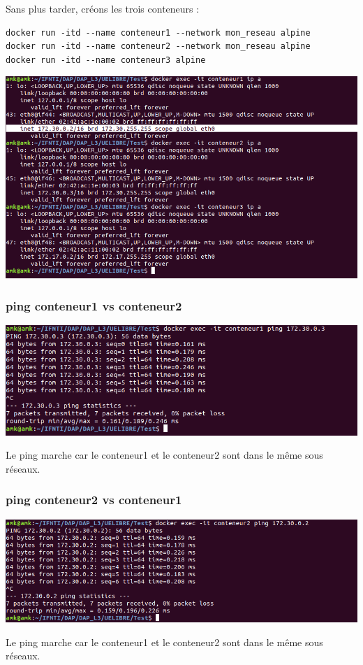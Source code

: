 \documentclass[12pt,a4paper]{article}
\begin{document}
Sans plus tarder, créons les trois conteneurs :
\begin{verbatim}
docker run -itd --name conteneur1 --network mon_reseau alpine
docker run -itd --name conteneur2 --network mon_reseau alpine
docker run -itd --name conteneur3 alpine
\end{verbatim}
\begin{center}
\includegraphics[scale=0.5]{img/ip_a_all_c.png}
\end{center}

\subsubsection{ping conteneur1 vs conteneur2}
\begin{center}
\includegraphics[scale=0.5]{img/ping_c1_c2.png}
\end{center}
Le ping marche car le conteneur1 et le conteneur2 sont dans le même sous réseaux.
\subsubsection{ping conteneur2 vs conteneur1}
\begin{center}
\includegraphics[scale=0.5]{img/ping_c2_c1.png}
\end{center}
Le ping marche car le conteneur1 et le conteneur2 sont dans le même sous réseaux.
\end{document}
